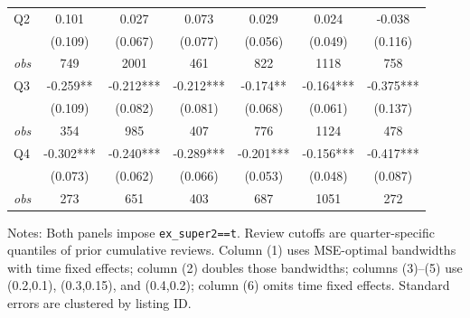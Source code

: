 \begin{table}[!htbp]
\begin{tabular}{lcccccc}
Q2 & 0.101 & 0.027 & 0.073 & 0.029 & 0.024 & -0.038 \\
 & (0.109) & (0.067) & (0.077) & (0.056) & (0.049) & (0.116) \\
\textit{obs} & 749 & 2001 & 461 & 822 & 1118 & 758 \\
Q3 & -0.259** & -0.212*** & -0.212*** & -0.174** & -0.164*** & -0.375*** \\
 & (0.109) & (0.082) & (0.081) & (0.068) & (0.061) & (0.137) \\
\textit{obs} & 354 & 985 & 407 & 776 & 1124 & 478 \\
Q4 & -0.302*** & -0.240*** & -0.289*** & -0.201*** & -0.156*** & -0.417*** \\
 & (0.073) & (0.062) & (0.066) & (0.053) & (0.048) & (0.087) \\
\textit{obs} & 273 & 651 & 403 & 687 & 1051 & 272 \\
\bottomrule
\end{tabular}
\begin{minipage}{0.98\textwidth}\footnotesize
Notes: Both panels impose \texttt{ex\_super2==t}. Review cutoffs are quarter-specific quantiles of prior cumulative reviews. Column (1) uses MSE-optimal bandwidths with time fixed effects; column (2) doubles those bandwidths; columns (3)--(5) use (0.2,0.1), (0.3,0.15), and (0.4,0.2); column (6) omits time fixed effects. Standard errors are clustered by listing ID.
\end{minipage}
\end{table}

